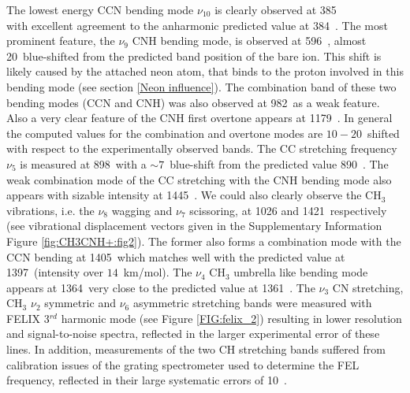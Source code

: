 The lowest energy CCN bending mode $\nu_{10}$ is clearly observed at 385~\wn\\ with excellent agreement to the anharmonic predicted value at 384~\wn. The most prominent feature, the $\nu_9$ CNH bending mode, is observed at 596~\wn, almost 20~\wnn blue-shifted from the predicted band position of the bare ion. This shift is likely caused by the attached neon atom, that binds to the proton involved in this bending mode (see section \ref{Neon influence}). The combination band of these two bending modes (CCN and CNH) was also observed at 982~\wnn as a weak feature. Also a very clear feature of the CNH first overtone appears at 1179~\wn. In general the computed values for the combination and overtone modes are $10-20$~\wnn shifted with respect to the experimentally observed bands. The CC stretching frequency $\nu_5$ is measured at 898~\wnn with a $\sim7$~\wnn blue-shift from the predicted value 890~\wn. The weak combination mode of the CC stretching with the CNH bending mode also appears with sizable intensity at 1445~\wn. We could also clearly observe the CH$_3$ vibrations, i.e. the $\nu_8$ wagging and $\nu_7$ scissoring, at 1026 and 1421~\wnn respectively (see vibrational displacement vectors given in the Supplementary Information Figure \ref{fig:CH3CNH+:fig2}). The former also forms a combination mode with the CCN bending at 1405~\wnn which matches well with the predicted value at 1397~\wnn (intensity over $14$~km/mol). The $\nu_4$ CH$_3$ umbrella like bending mode appears at 1364~\wnn very close to the predicted value at 1361~\wn. The $\nu_3$ CN stretching,  CH$_3$ $\nu_2$ symmetric and $\nu_6$ asymmetric stretching bands were measured with FELIX 3$^{rd}$ harmonic mode (see Figure \ref{FIG:felix_2}) resulting in lower resolution and signal-to-noise spectra, reflected in the larger experimental error of these lines. In addition, measurements of the two CH stretching bands suffered from calibration issues of the grating spectrometer used to determine the FEL frequency, reflected in their large systematic errors of 10~\wn.



    
